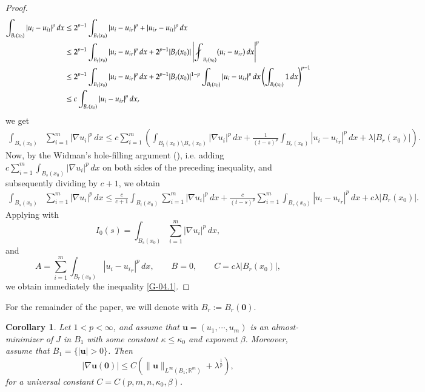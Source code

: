 \documentclass{amsart}
\newtheorem{corollary}[theorem]{Corollary}
\def\avint{\mathop{\,\rlap{$\diagup$}\!\!\int}\nolimits}
\begin{document}
\begin{proof}
$$ 
\begin{aligned}
\int_{B_t(x_0)} |u_i-{u_i}_t|^p \, dx 
& \leq 2^{p-1} \int_{B_t(x_0)} |u_i-{u_i}_r|^p + |{u_i}_r-{u_i}_t|^p \, dx \\
& \leq 2^{p-1} \int_{B_t(x_0)} |u_i-{u_i}_r|^p \, dx + 2^{p-1} |B_t(x_0)| \left| \avint_{B_t(x_0)} (u_i-{u_i}_r) \, dx \right|^p \\
& \leq 2^{p-1} \int_{B_t(x_0)} |u_i-{u_i}_r|^p \, dx + 2^{p-1} |B_t(x_0)|^{1-p} \int_{B_t(x_0)} |u_i-{u_i}_r|^p \, dx \left( \int_{B_t(x_0)} 1 \, dx \right)^{p-1} \\
& \leq c \int_{B_r(x_0)} |u_i-{u_i}_r|^p \, dx,
\end{aligned}
$$
we get
$$
\begin{aligned}
\int_{B_s(x_0)} & \sum_{i=1}^m |\nabla u_i|^p \, dx  \leq c \sum_{i=1}^m\left( \int_{B_t(x_0) \setminus B_s(x_0)} |\nabla u_i|^p \, dx + \frac{1}{(t-s)^p} \int_{B_r(x_0)} |u_i-{u_i}_r|^p \, dx + \lambda \left| B_r(x_0) \right| \right).
\end{aligned}
$$
Now, by the Widman's hole-filling argument (\cite{widman1971holder}), i.e. adding $c \sum_{i=1}^{m}\int_{B_s(x_0)}  |\nabla u_i|^p  \, dx$ on both sides of the preceding inequality, and subsequently dividing by $c+1$, we obtain
$$
\begin{aligned}
\int_{B_s(x_0)} & \sum_{i=1}^m|\nabla u_i|^p \, dx \leq \frac{c}{c+1} \int_{B_t(x_0)} \sum_{i=1}^m|\nabla u_i|^p \, dx + \frac{c}{(t-s)^p} \sum_{i=1}^m\int_{B_r(x_0)} |u_i-{u_i}_r|^p \, dx + c\lambda \left| B_r(x_0) \right|.
\end{aligned}
$$
Applying \cite[Lemma 6.1]{giusti2003direct} with
$$ I_0(s)=\int_{B_s(x_0)} \sum_{i=1}^m|\nabla u_i|^p \, dx, $$
and
$$ A=\sum_{i=1}^m\int_{B_r(x_0)} |u_i-{u_i}_r|^p \, dx, \qquad B=0, \qquad C=c\lambda \left| B_r(x_0) \right|, $$
we obtain immediately the inequality \eqref{G-04.1}.
\end{proof}

For the remainder of the paper, we will denote with $B_r:=B_r(\mathbf{0})$.

\begin{corollary}
\label{imp-cor}
Let $1<p<\infty$, and assume that $\mathbf{u}=(u_1, \cdots,u_m)$ is an almost-minimizer of $J$ in $B_1$ with some constant $\kappa\le \kappa_0$ and exponent $\beta$. Moreover, assume that $B_1=\{|\mathbf{u}| > 0\}$. Then 
\[
|\nabla \mathbf{u}(\mathbf{0})| \le C \left(
\| \mathbf{u}\|_{L^\infty(B_1; \mathbb{R}^m)} + \lambda^{\frac{1}{p}} \right),
\]
for a universal constant $C= C(p, m, n, \kappa_0, \beta)$.
\end{corollary}
\end{document}
